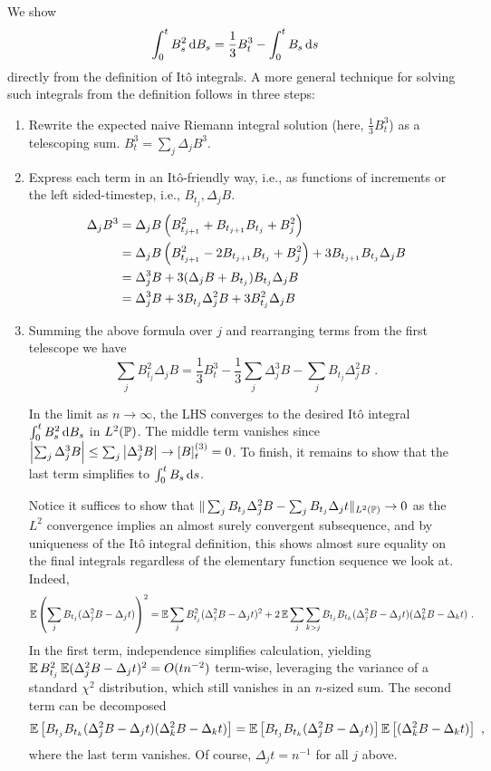 \documentclass{article}
\begin{document}
\subsection{}
\label{pt2}

We show
\[
  \int_0^t B_s^2\d{B_s}=\frac{1}{3}B_t^3-\int_0^tB_s\d{s}
\]
directly from the definition of It\^{o} integrals. A more general technique for solving such integrals from the definition follows in three steps:

\begin{enumerate}
\item Rewrite the expected naive Riemann integral solution (here, \(\frac{1}{3}B_t^3\)) as a telescoping sum. \(B_t^3=\sum_j\Delta_jB^3\).
\item Express each term in an It\^{o}-friendly way, i.e., as functions of increments or the left sided-timestep, i.e., \(B_{t_j},\Delta_jB\).
  \begin{align*}
    \Delta_jB^3&=\Delta_jB\pa{B_{t_{j+1}}^2+B_{t_{j+1}}B_{t_j}+B_{j}^2}\\
    &=\Delta_jB\pa{B_{t_{j+1}}^2-2B_{t_{j+1}}B_{t_j}+B_{j}^2}+3B_{t_{j+1}}B_{t_j}\Delta_jB\\
    &=\Delta_j^3B+3(\Delta_jB+B_{t_j})B_{t_j}\Delta_jB\\
    &=\Delta_j^3B+3B_{t_j}\Delta_j^2B+3B_{t_j}^2\Delta_jB
  \end{align*}
\item Summing the above formula over \(j\) and rearranging terms from the first telescope we have
  \[
    \sum_jB_{t_j}^2\Delta_jB=\frac{1}{3}B_t^3-\frac{1}{3}\sum_j\Delta_j^3B-\sum_jB_{t_j}\Delta_j^2B\,\,.
  \]

  In the limit as \(n\rightarrow\infty\), the LHS converges to the desired It\^{o} integral \(  \int_0^t B_s^2\d{B_s}\) in \(L^2(\P)\). The middle term vanishes since \(\abs{\sum_j\Delta_j^3B}\le\sum_j\abs{\Delta_j^3B}\rightarrow[B]_t^{(3)}=0\). To finish, it remains to show that the last term simplifies to \(\int_0^tB_s\d{s}\).

  Notice it suffices to show that \(\|\sum_jB_{t_j}\Delta_j^2B-\sum_jB_{t_j}\Delta_jt\|_{L^2(\P)}\rightarrow 0\) as the \(L^2\) convergence implies an almost surely convergent subsequence, and by uniqueness of the It\^{o} integral definition, this shows almost sure equality on the final integrals regardless of the elementary function sequence we look at. Indeed,
\begin{align*}
  \E\pa{\sum_jB_{t_j}(\Delta_j^2B-\Delta_jt)}^2
    &=\E\sum_jB_{t_j}^2(\Delta_j^2B-\Delta_jt)^2+2\E\sum_j\sum_{k> j}B_{t_j}B_{t_k}(\Delta_j^2B-\Delta_jt)(\Delta_k^2B-\Delta_kt)\,\,.
\end{align*}
In the first term, independence simplifies calculation, yielding \(\E B_{t_j}^2\E(\Delta_j^2B-\Delta_jt)^2=O(tn^{-2})\) term-wise, leveraging the variance of a standard \(\chi^2\) distribution, which still vanishes in an \(n\)-sized sum. The second term can be decomposed
\[
  \E \ha{B_{t_j}B_{t_k}(\Delta_j^2B-\Delta_jt)(\Delta_k^2B-\Delta_kt)}
  =  \E \ha{B_{t_j}B_{t_k}(\Delta_j^2B-\Delta_jt)}\E\ha{(\Delta_k^2B-\Delta_kt)}\,\,,
\]
where the last term vanishes. Of course, \(\Delta_jt=n^{-1}\) for all \(j\) above.
  \end{enumerate}
\end{document}
